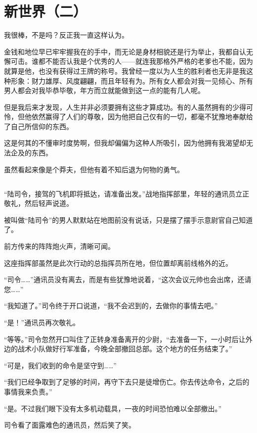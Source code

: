\chapter{新世界（二）}

\begin{QuoteEnv}{}
我很棒，不是吗？反正我一直这样认为。

金钱和地位早已牢牢握我在的手中，而无论是身材相貌还是行为举止，我都自认无懈可击。谁都不能否认我是个优秀的人——就连我那格外严格的老爹也不能，因为就算是他，也没有获得过王牌的称号。我曾经一度以为人生的胜利者也无非是我这种形象：财力雄厚、风度翩翩，而且年轻有为。所有女人都会对我一见倾心、所有男人都会对我毕恭毕敬，年方而立就能做到这一点的能有几人呢。

但是我后来才发现，人生并非必须要拥有这些才算成功。有的人虽然拥有的少得可怜，但他依然赢得了人们的尊敬，因为他把自己仅有的一切，都毫不犹豫地奉献给了自己所信仰的东西。

这是何其的不懂审时度势啊，但我却偏偏为这种人所吸引，因为他拥有我渴望却无法企及的东西。

虽然看起来像是个莽夫，但他有着不知后退为何物的勇气。
\end{QuoteEnv}
\section*{}
“陆司令，接驾的飞机即将抵达，请准备出发。”战地指挥部里，年轻的通讯员立正敬礼，然后轻声说道。

被叫做“陆司令”的男人默默站在地图前没有说话，只是摆了摆手示意尉官自己知道了。

前方传来的阵阵炮火声，清晰可闻。

这座指挥部虽然是此次行动的总指挥员所在地，但位置却离前线格外的近。

“司令……”通讯员没有离去，而是有些犹豫地说着，“这次会议元帅也会出席，还请您……”

“我知道了。”司令终于开口说道，“我不会迟到的，去做你的事情去吧。”

“是！”通讯员再次敬礼。

“等等。”司令忽然开口叫住了正转身准备离开的少尉，“去准备一下，一小时后让外边的战术小队做好行军准备，今晚全部撤回总部。这个地方的任务结束了。”

“可是，我们收到的命令是坚守到……”

“我们已经争取到了足够的时间，再守下去只是徒增伤亡。你去传达命令，之后的事情我来负责。”

“是。不过我们眼下没有太多机动载具，一夜的时间恐怕难以全部撤出。”

司令看了面露难色的通讯员，然后笑了笑。

